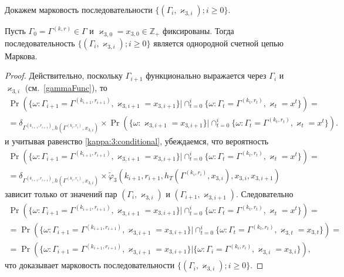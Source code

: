 \documentclass[a4paper,12pt,russian]{extarticle}
\newcommand{\MarkThree}{\{(\Gamma_i, \varkappa_{3,i}); i \geqslant 0\}}
\newcommand{\mll}[1]{\begin{multline*}#1\end{multline*}}
\begin{document}
Докажем марковость последовательности $\MarkThree$.
\begin{theorem}
Пусть $\Gamma_0=\Gamma^{(k,r)}\in \Gamma$ и $\varkappa_{3,0}=x_{3,0}\in \mathbb{Z}_+$ фиксированы. Тогда последовательность $\MarkThree$ является однородной счетной цепью Маркова.
\end{theorem}
\begin{proof}
Действительно, поскольку $\Gamma_{i+1}$ функционально выражается через $\Gamma_i$ и $\varkappa_{3,i}$ (см.~\eqref{gammaFunc}), то
\mll
{
\Pr (\{ \omega \colon \Gamma_{i+1} =\Gamma^{(k_{i+1},r_{i+1})},\varkappa_{3,i+1} = x_{3,i+1}\} |\cap_{t=0}^{i}\{\omega\colon \Gamma_t=\Gamma^{(k_t,r_t)}, \varkappa_t=x^t\})=\\
=\delta_{\Gamma^{(k_{i+1},r_{i+1})},h(\Gamma^{(k_i,r_i)},x_{3,i})}\times \Pr (\{ \omega \colon \varkappa_{3,i+1} = x_{3,i+1}\} |\cap_{t=0}^{i}\{\omega\colon \Gamma_t=\Gamma^{(k_t,r_t)}, \varkappa_t=x^t\}).
}
и учитывая равенство \eqref{kappa:3:conditional}, убеждаемся, что вероятность 
\mll
{
\Pr (\{ \omega \colon \Gamma_{i+1} =\Gamma^{(k_{i+1},r_{i+1})},\varkappa_{3,i+1} = x_{3,i+1}\} |\cap_{t=0}^{i}\{\omega\colon \Gamma_t=\Gamma^{(k_t,r_t)}, \varkappa_t=x^t\}) = \\
=\delta_{\Gamma^{(k_{i+1},r_{i+1})},h(\Gamma^{(k_i,r_i)},x_{3,i})} \times \widetilde{\varphi}_3(k_{i+1},r_{i+1},h_T(\Gamma^{(k_i,r_i)},x_{3,i}),x_{3,i},x_{3,i+1})
}
зависит только от значений пар $(\Gamma_i,\varkappa_{3,i})$ и $(\Gamma_{i+1},\varkappa_{3,i+1})$. Следовательно 
\mll
{
\Pr (\{ \omega \colon \Gamma_{i+1} =\Gamma^{(k_{i+1},r_{i+1})},\varkappa_{3,i+1} = x_{3,i+1}\} |\cap_{t=0}^{i}\{\omega\colon \Gamma_t=\Gamma^{(k_t,r_t)}, \varkappa_t=x^t\})=\\
=\Pr (\{ \omega \colon \Gamma_{i+1} =\Gamma^{(k_{i+1},r_{i+1})},\varkappa_{3,i+1} = x_{3,i+1}\} |\cap_{t=0}^{i}\{\omega\colon \Gamma_t=\Gamma^{(k_t,r_t)}, \varkappa_{3,t}=x_{3,t}\})=\\
=\Pr (\{ \omega \colon \Gamma_{i+1} =\Gamma^{(k_{i+1},r_{i+1})},\varkappa_{3,i+1} = x_{3,i+1}\} |\{\omega\colon \Gamma_i=\Gamma^{(k_i,r_i)}, \varkappa_{3,i}=x_{3,i}\}),
}
что доказывает марковость последовательности $\MarkThree$.
\end{proof}
\end{document}
